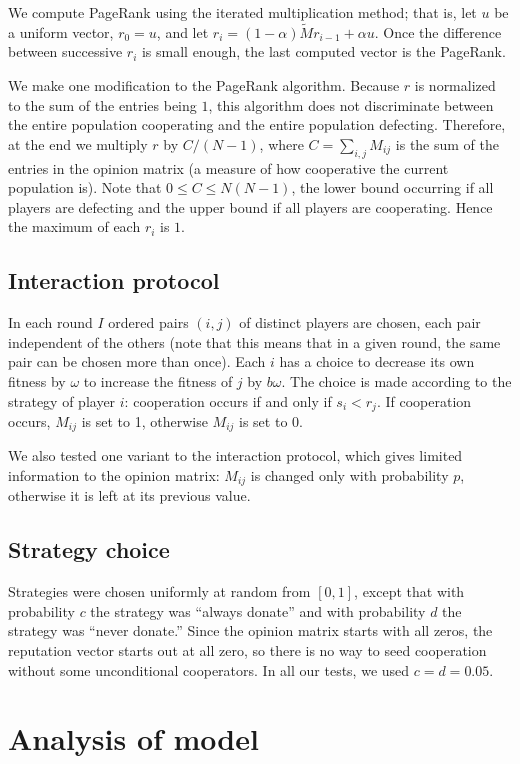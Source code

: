 \documentclass{amsart}
\begin{document}
We compute PageRank using the iterated multiplication method; that is,
let $u$ be a uniform vector, $r_0 = u$, and let $r_i =
(1-\alpha)\tilde M r_{i-1} + \alpha u$. Once the difference between
successive $r_i$ is small enough, the last computed vector is the
PageRank.

We make one modification to the PageRank algorithm. Because $r$ is
normalized to the sum of the entries being $1$, this algorithm does
not discriminate between the entire population cooperating and the
entire population defecting. Therefore, at the end we multiply $r$ by
$C/(N-1)$, where $C = \sum_{i,j} M_{ij}$ is the sum of the entries in
the opinion matrix (a measure of how cooperative the current
population is). Note that $0 \le C \le N(N-1)$, the lower bound
occurring if all players are defecting and the upper bound if all
players are cooperating. Hence the maximum of each $r_i$ is $1$.

\subsection{Interaction protocol}
\label{sec:inter_protocol}
In each round $I$ ordered pairs $(i,j)$ of distinct players are
chosen, each pair independent of the others (note that this means that
in a given round, the same pair can be chosen more than once). Each
$i$ has a choice to decrease its own fitness by $\omega$ to increase
the fitness of $j$ by $b \omega$. The choice is made according to the
strategy of player $i$: cooperation occurs if and only if $s_i <
r_j$. If cooperation occurs, $M_{ij}$ is set to 1, otherwise
$M_{ij}$ is set to $0$.

We also tested one variant to the interaction protocol, which gives
limited information to the opinion matrix: $M_{ij}$ is changed only
with probability $p$, otherwise it is left at its previous value.

\subsection{Strategy choice}
Strategies were chosen uniformly at random from $[0,1]$, except that
with probability $c$ the strategy was ``always donate'' and with
probability $d$ the strategy was ``never donate.'' Since the opinion
matrix starts with all zeros, the reputation vector starts out at all
zero, so there is no way to seed cooperation without some
unconditional cooperators. In all our tests, we used $c=d=0.05$.

\section{Analysis of model}
\label{sec:analysis}
\end{document}
